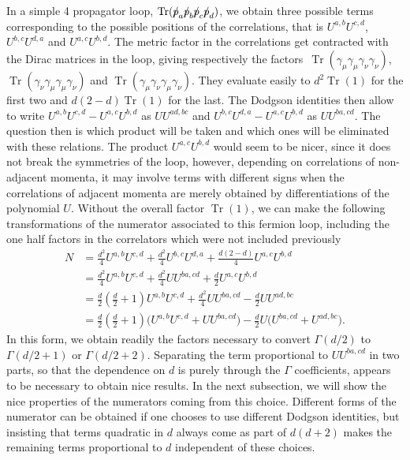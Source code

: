 \documentclass[pdftex]{sigma}
\numberwithin{equation}{section}
\def\dirp{{\slash \mkern -9mu p}}
\DeclareMathOperator{\Tr}{Tr}
\begin{document}
In a simple 4 propagator loop, $\Tr ( \dirp_a \dirp_b \dirp_c \dirp_d )$, we obtain three possible
terms corresponding to the possible positions of the correlations, that is $U^{a,b} U^{c,d}$,
$U^{b,c} U^{d,a}$ and $U^{a,c} U^{b,d}$. The metric factor in the correlations get contracted with the Dirac matrices in the loop, giving
respectively the factors~$\Tr (\gamma_\mu \gamma_\mu \gamma_\nu \gamma_\nu)$,
 $\Tr (\gamma_\nu \gamma_\mu \gamma_\mu \gamma_\nu)$ and
 $\Tr (\gamma_\mu \gamma_\nu \gamma_\mu \gamma_\nu)$. They evaluate easily to $d^2 \Tr (1)$ for the first
two and $d(2-d) \Tr(1)$ for the last. The Dodgson identities then allow to write
$U^{a,b} U^{c,d} - U^{a,c} U^{b,d}$ as $U U^{ad,bc} $ and $U^{b,c} U^{d,a} - U^{a,c} U^{b,d}$ as $U U^{ba,cd}$.
The question then is which product will be taken and which ones will be eliminated with these
relations. The product $U^{a,c} U^{b,d}$ would seem to be nicer, since it does not break the
symmetries of the loop, however, depending on correlations of non-adjacent momenta, it may involve
terms with different signs when the correlations of adjacent momenta are merely obtained by
differentiations of the polynomial $U$. Without the overall factor $\Tr(1)$, we can make the
following transformations of the numerator associated to this fermion loop, including the one half factors in the
correlators which were not included previously
\begin{align}
 	N &= \frac{d^2}4 U^{a,b} U^{c,d} + \frac {d^2}4 U^{b,c} U^{d,a} +\frac {d (2-d)}4 U^{a,c} U^{b,d} \nonumber \\
	&= \frac{d^2}4 U^{a,b} U^{c,d} +\frac{d^2}4 U U^{ba,cd} + \frac d2 U^{a,c} U^{b,d} \nonumber \\
	&= \frac d2 \left( \frac d2 + 1\right) U^{a,b} U^{c,d} + \frac{d^2}4 U U^{ba,cd} - \frac d2 U U^{ad,bc} \nonumber \\
	&= \frac d2 \left( \frac d2 + 1\right) \bigl( U^{a,b} U^{c,d} + U U^{ba,cd} \bigr)
		- \frac d2 U \bigl( U^{ba,cd} + U^{ad,bc} \bigr). \label{4fin}
\end{align}
In this form, we obtain readily the factors necessary to convert $\Gamma(d/2)$ to $\Gamma(d/2+1)$
or $\Gamma(d/2+2)$. Separating the term proportional to $U U^{ba,cd}$ in two parts, so that the
dependence on $d$ is purely through the $\Gamma$ coefficients, appears to be necessary to obtain
nice results. In the next subsection, we will show the nice properties of the numerators coming from this choice.
Different forms of the numerator can be obtained if
one chooses to use different Dodgson identities, but insisting that terms quadratic in $d$ always
come as part of $d(d+2)$ makes the remaining terms proportional to $d$ independent of these
choices.
\end{document}
